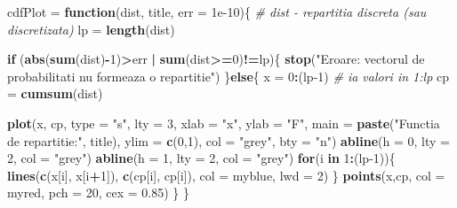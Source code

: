 \documentclass[]{article}
\newenvironment{Shaded}{\begin{snugshade}}{\end{snugshade}}
\newcommand{\CommentTok}[1]{\textcolor[rgb]{0.56,0.35,0.01}{\textit{#1}}}
\newcommand{\ControlFlowTok}[1]{\textcolor[rgb]{0.13,0.29,0.53}{\textbf{#1}}}
\newcommand{\DataTypeTok}[1]{\textcolor[rgb]{0.13,0.29,0.53}{#1}}
\newcommand{\DecValTok}[1]{\textcolor[rgb]{0.00,0.00,0.81}{#1}}
\newcommand{\FloatTok}[1]{\textcolor[rgb]{0.00,0.00,0.81}{#1}}
\newcommand{\KeywordTok}[1]{\textcolor[rgb]{0.13,0.29,0.53}{\textbf{#1}}}
\newcommand{\NormalTok}[1]{#1}
\newcommand{\OperatorTok}[1]{\textcolor[rgb]{0.81,0.36,0.00}{\textbf{#1}}}
\newcommand{\StringTok}[1]{\textcolor[rgb]{0.31,0.60,0.02}{#1}}
\begin{document}
\begin{Shaded}
\begin{Highlighting}[]
\NormalTok{cdfPlot =}\StringTok{ }\ControlFlowTok{function}\NormalTok{(dist, title, }\DataTypeTok{err =} \FloatTok{1e-10}\NormalTok{)\{}
  \CommentTok{# dist - repartitia discreta (sau discretizata)}
\NormalTok{  lp =}\StringTok{ }\KeywordTok{length}\NormalTok{(dist)}
  
  \ControlFlowTok{if}\NormalTok{ (}\KeywordTok{abs}\NormalTok{(}\KeywordTok{sum}\NormalTok{(dist)}\OperatorTok{-}\DecValTok{1}\NormalTok{)}\OperatorTok{>}\NormalTok{err }\OperatorTok{|}\StringTok{ }\KeywordTok{sum}\NormalTok{(dist}\OperatorTok{>=}\DecValTok{0}\NormalTok{)}\OperatorTok{!=}\NormalTok{lp)\{}
    \KeywordTok{stop}\NormalTok{(}\StringTok{"Eroare: vectorul de probabilitati nu formeaza o repartitie"}\NormalTok{)}
\NormalTok{  \}}\ControlFlowTok{else}\NormalTok{\{}
\NormalTok{    x =}\StringTok{ }\DecValTok{0}\OperatorTok{:}\NormalTok{(lp}\DecValTok{-1}\NormalTok{) }\CommentTok{# ia valori in 1:lp}
\NormalTok{    cp =}\StringTok{ }\KeywordTok{cumsum}\NormalTok{(dist)}
    
    \KeywordTok{plot}\NormalTok{(x, cp, }\DataTypeTok{type =} \StringTok{"s"}\NormalTok{, }\DataTypeTok{lty =} \DecValTok{3}\NormalTok{, }
         \DataTypeTok{xlab =} \StringTok{"x"}\NormalTok{, }
         \DataTypeTok{ylab =} \StringTok{"F"}\NormalTok{, }
         \DataTypeTok{main =} \KeywordTok{paste}\NormalTok{(}\StringTok{"Functia de repartitie:"}\NormalTok{, title), }
         \DataTypeTok{ylim =} \KeywordTok{c}\NormalTok{(}\DecValTok{0}\NormalTok{,}\DecValTok{1}\NormalTok{), }
         \DataTypeTok{col =} \StringTok{"grey"}\NormalTok{,}
         \DataTypeTok{bty =} \StringTok{"n"}\NormalTok{)}
    \KeywordTok{abline}\NormalTok{(}\DataTypeTok{h =} \DecValTok{0}\NormalTok{, }\DataTypeTok{lty =} \DecValTok{2}\NormalTok{, }\DataTypeTok{col =} \StringTok{"grey"}\NormalTok{)}
    \KeywordTok{abline}\NormalTok{(}\DataTypeTok{h =} \DecValTok{1}\NormalTok{, }\DataTypeTok{lty =} \DecValTok{2}\NormalTok{, }\DataTypeTok{col =} \StringTok{"grey"}\NormalTok{)}
    \ControlFlowTok{for}\NormalTok{(i }\ControlFlowTok{in} \DecValTok{1}\OperatorTok{:}\NormalTok{(lp}\DecValTok{-1}\NormalTok{))\{}
      \KeywordTok{lines}\NormalTok{(}\KeywordTok{c}\NormalTok{(x[i], x[i}\OperatorTok{+}\DecValTok{1}\NormalTok{]), }\KeywordTok{c}\NormalTok{(cp[i], cp[i]), }
            \DataTypeTok{col =}\NormalTok{ myblue,}
            \DataTypeTok{lwd =} \DecValTok{2}\NormalTok{)}
\NormalTok{    \}}
    \KeywordTok{points}\NormalTok{(x,cp, }\DataTypeTok{col =}\NormalTok{ myred, }\DataTypeTok{pch =} \DecValTok{20}\NormalTok{, }\DataTypeTok{cex =} \FloatTok{0.85}\NormalTok{)}
\NormalTok{  \}}
\NormalTok{\}}
\end{Highlighting}
\end{Shaded}
\end{document}
